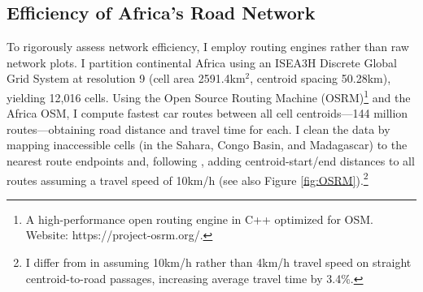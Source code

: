 \documentclass[a4paper]{article}
\begin{document}
\subsection{Efficiency of Africa's Road Network}

To rigorously assess network efficiency, I employ routing engines rather than raw network plots. I partition continental Africa using an ISEA3H Discrete Global Grid System \citep{sahr2003geodesic, sahr2022user, dggridR} at resolution 9 (cell area 2591.4km$^2$, centroid spacing 50.28km), yielding 12,016 cells. Using the Open Source Routing Machine (OSRM)\footnote{A high-performance open routing engine in C++ optimized for OSM. Website: https://project-osrm.org/.} and the Africa OSM, I compute fastest car routes between all cell centroids---144 million routes---obtaining road distance and travel time for each. I clean the data by mapping inaccessible cells (in the Sahara, Congo Basin, and Madagascar) to the nearest route endpoints and, following \citet{graff2019spatial}, adding centroid-start/end distances to all routes assuming a travel speed of 10km/h (see also Figure \ref{fig:OSRM}).\footnote{I differ from \citet{graff2019spatial} in assuming 10km/h rather than 4km/h travel speed on straight centroid-to-road passages, increasing average travel time by 3.4\%.} \newline
\end{document}

